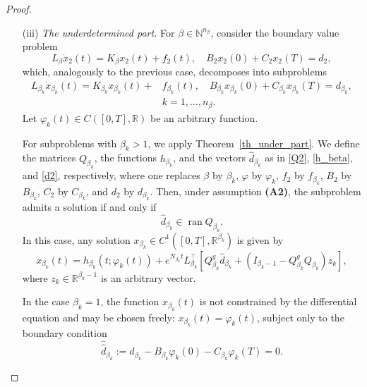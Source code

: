 \documentclass[preprint,12pt]{elsarticle}
\numberwithin{equation}{section}
\theoremstyle{definition}
\begin{document}
\begin{proof}
\begin{itemize}
Consequently, the solution of the full system \eqref{alg_BVP_gen_proof} is
\begin{equation}\label{sol_x1_genBVP}
    x_1(t) = -\sum_{i=0}^{\nu_\alpha - 1} N_{\alpha}^i f_1^{(i)}(t),
\end{equation}
and it exists if and only if
\begin{equation*}\label{cond_x1_alpha}
    \widehat{d}_1:=d_1-\bar{d}_1= 0.
\end{equation*}

\item[(iii)] \emph{The underdetermined part.}  
For \( \beta \in \mathbb{N}^{n_{\beta}} \), consider the boundary value problem
\begin{equation}\label{under_BVP_gen_proof}
   L_\beta \dot{x}_2(t) = K_\beta x_2(t) + f_2(t), \quad B_2 x_2(0) + C_2 x_2(T) = d_2,
\end{equation}
which, analogously to the previous case, decomposes into subproblems
\[\begin{aligned}
    L_{\beta_k} \dot{x}_{\beta_k}(t) = K_{\beta_k} x_{\beta_k}(t) +& f_{\beta_k}(t), \quad 
B_{\beta_k} x_{\beta_k}(0) + C_{\beta_k} x_{\beta_k}(T) = d_{\beta_k}, \\
&k = 1, \ldots, n_\beta.
\end{aligned}
\]
Let \( \varphi_k(t) \in C([0,T], \mathbb{R}) \) be an arbitrary function.

For subproblems with \( \beta_k > 1 \), we apply Theorem~\ref{th_under_part}. We define the matrices \( Q_{\beta_k} \), the functions \( h_{\beta_k} \), and the vectors \( \widehat{d}_{\beta_k} \) as in \eqref{Q2}, \eqref{h_beta}, and \eqref{d2}, respectively, 
where one replaces $\beta$ by $\beta_k$, $\varphi$ by $\varphi_k$,
$f_2$ by $f_{\beta_k}$, $B_2$ by $B_{\beta_k}$, $C_2$ by $C_{\beta_k}$, and $d_2$ by $d_{\beta_k}$. Then, under assumption \textbf{(A2)}, the subproblem admits a solution if and only if
\[
\widehat{d}_{\beta_k} \in \operatorname{ran} Q_{\beta_k}.
\]
In this case, any solution $x_{\beta_k} \in C^1([0,T],\mathbb{R}^{\beta_k})$ is given by
\begin{equation*}\label{sol_xbeta_k_proof}
x_{\beta_k}(t) = h_{\beta_k}(t; \varphi_k(t)) + e^{N_{\beta_k} t} L_{\beta_k}^\top \left[ Q_{\beta_k}^g \widehat{d}_{\beta_k} + \left(I_{\beta_k - 1} - Q_{\beta_k}^g Q_{\beta_k} \right) z_k \right],
\end{equation*}
where \( z_k \in \mathbb{R}^{\beta_k - 1} \) is an arbitrary vector.


In the case $\beta_k = 1$, the function $x_{\beta_k}(t)$ is not constrained by the differential equation and may be chosen freely: $x_{\beta_k}(t) = \varphi_k(t)$, subject only to the boundary condition
\begin{equation*}\label{BC_condition_beta1}
   \hat{\hat{d}}_{\beta_k} := d_{\beta_k} - B_{\beta_k} \varphi_k(0) - C_{\beta_k} \varphi_k(T) = 0.
\end{equation*}


\end{itemize}
\end{proof}
\end{document}
